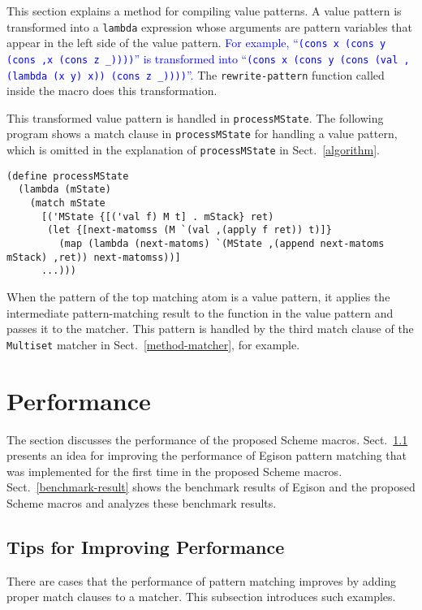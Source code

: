 \documentclass[acmlarge]{acmart}
\newcommand{\new}[1]{\textcolor{blue}{#1}}
\begin{document}
This section explains a method for compiling value patterns.
A value pattern is transformed into a \lstinline{lambda} expression whose arguments are pattern variables that appear in the left side of the value pattern.
\new{
For example, ``\lstinline{(cons x (cons y (cons ,x (cons z _))))}'' is transformed into ``\lstinline{(cons x (cons y (cons (val ,(lambda (x y) x)) (cons z _))))}''.
}
The \lstinline{rewrite-pattern} function called inside the macro does this transformation.

This transformed value pattern is handled in \lstinline{processMState}.
The following program shows a match clause in \lstinline{processMState} for handling a value pattern, which is omitted in the explanation of \lstinline{processMState} in Sect.~\ref{algorithm}.

\begin{lstlisting}[language=egison]
(define processMState
  (lambda (mState)
    (match mState
      [('MState {[('val f) M t] . mStack} ret)
       (let {[next-matomss (M `(val ,(apply f ret)) t)]}
         (map (lambda (next-matoms) `(MState ,(append next-matoms mStack) ,ret)) next-matomss))]
      ...)))
\end{lstlisting}

\noindent
When the pattern of the top matching atom is a value pattern, it applies the intermediate pattern-matching result to the function in the value pattern and passes it to the matcher.
This pattern is handled by the third match clause of the \lstinline{Multiset} matcher in Sect.~\ref{method-matcher}, for example.

\section{Performance}\label{performance}

The section discusses the performance of the proposed Scheme macros.
Sect.~\ref{tip} presents an idea for improving the performance of Egison pattern matching that was implemented for the first time in the proposed Scheme macros.
Sect.~\ref{benchmark-result} shows the benchmark results of Egison and the proposed Scheme macros and analyzes these benchmark results.

\subsection{Tips for Improving Performance}\label{tip}

There are cases that the performance of pattern matching improves by adding proper match clauses to a matcher.
This subsection introduces such examples.
\end{document}
